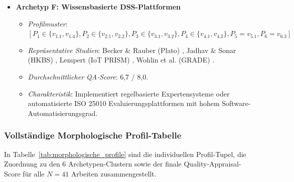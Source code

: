 \begin{itemize}
    \item \textbf{Archetyp F: Wissensbasierte DSS-Plattformen}
    \begin{itemize}
        \item \textit{Profilmuster}: $[P_1 \in \{v_{1.1}, v_{1.4}\}, P_2 \in \{v_{2.1}, v_{2.2}\}, P_3 \in \{v_{3.1}, v_{3.2}\}, P_4 \in \{v_{4.1}, v_{4.2}\}, P_5=v_{5.1}, P_6=v_{6.3}]$
        \item \textit{Repräsentative Studien}: Becker \& Rauber (Plato) \cite{8VHUMEKY}, Jadhav \& Sonar (HKBS) \cite{U4E7VXQU}, Lempert (IoT PRISM) \cite{RRU375GB}, Wohlin et al. (GRADE) \cite{JT5X3FIG}.
        \item \textit{Durchschnittlicher QA-Score}: 6,7 / 8,0.
        \item \textit{Charakteristik}: Implementiert regelbasierte Expertensysteme oder automatisierte ISO 25010 Evaluierungsplattformen mit hohem Software-Automatisierungsgrad.
    \end{itemize}
\end{itemize}

\subsubsection{Vollständige Morphologische Profil-Tabelle}

In Tabelle~\ref{tab:morphologische_profile} sind die individuellen Profil-Tupel, die Zuordnung zu den 6 Archetypen-Clustern sowie der finale Quality-Appraisal-Score für alle $N = 41$ Arbeiten zusammengestellt.

